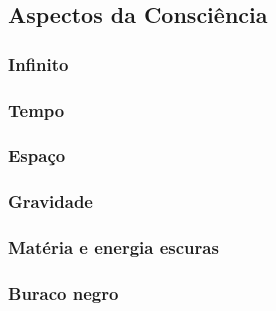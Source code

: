 \subsection{Aspectos da Consciência}
\lipsum[2]

\subsubsection{Infinito}
\lipsum[2] 

\subsubsection{Tempo}
\lipsum[2]

\subsubsection{Espaço}
\lipsum[2]

\subsubsection{Gravidade}
\lipsum[2]

\subsubsection{Matéria e energia escuras}
\lipsum[2]

\subsubsection{Buraco negro}
\lipsum[2]
